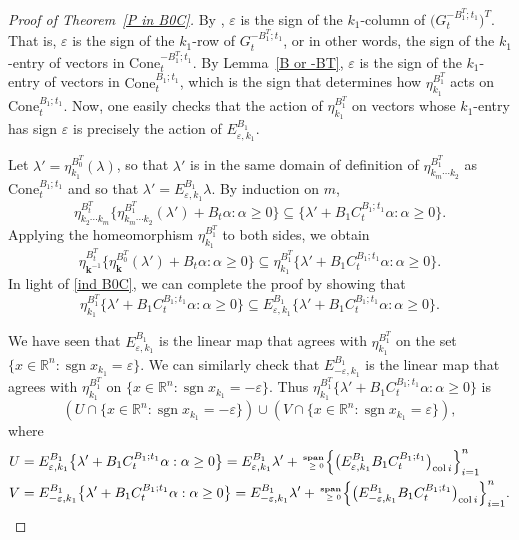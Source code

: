 \documentclass{amsart}
\theoremstyle{definition}
\theoremstyle{remark}
\numberwithin{equation}{section}
\newcommand{\reals}{\mathbb R}
\newcommand{\ep}{\varepsilon}
\newcommand{\col}{\operatorname{col}}
\newcommand{\sgn}{\operatorname{sgn}}
\newcommand{\nnspan}{{\!\!\tiny\begin{array}{r}\mathbf{span}\\\ge0\end{array}\hspace*{-0.57em}}}
\newcommand{\set}[1]{{\lbrace #1 \rbrace}}
\newcommand{\sett}[1]{{\bigl\lbrace #1 \bigr\rbrace}}
\newcommand{\settt}[1]{{\Bigl\lbrace #1 \Bigr\rbrace}}
\renewcommand{\th}{^\text{th}}
\newcommand{\0}{{\mathbf{0}}}
\newcommand{\Cone}{\mathrm{Cone}}
\newcommand{\kk}{{\boldsymbol{k}}}
\renewcommand{\th}{^\text{th}}
\begin{document}
\begin{proof}[Proof of Theorem~\ref{P in B0C}]
By \cite[(1.13)]{NZ}, $\ep$ is the sign of the $k_1$-column of $\bigl(G_t^{-B_1^T;t_1}\bigr)^T$.
That is, $\ep$ is the sign of the $k_1$-row of $G_t^{-B_1^T;t_1}$, or in other words, the sign of the $k_1$-entry of vectors in $\Cone_t^{-B^T_1;t_1}$.
By Lemma~\ref{B or -BT}, $\ep$ is the sign of the $k_1$-entry of vectors in $\Cone_t^{B_1;t_1}$, which is the sign that determines how $\eta_{k_1}^{B_1^T}$ acts on $\Cone_t^{B_1;t_1}$.
Now, one easily checks that the action of $\eta_{k_1}^{B_1^T}$ on vectors whose $k_1$-entry has sign $\ep$ is precisely the action of $E^{B_1}_{\ep,k_1}$.

Let $\lambda'=\eta_{k_1}^{B_0^T}(\lambda)$, so that $\lambda'$ is in the same domain of definition of $\eta_{k_m\cdots k_2}^{B_1^T}$ as $\Cone_t^{B_1;t_1}$ and so that $\lambda'=E^{B_1}_{\ep,k_1}\lambda$.
By induction on $m$, 
\[\eta_{k_2\cdots k_m}^{B_t^T}\set{\eta_{k_m\cdots k_2}^{B_1^T}(\lambda')+B_t\alpha:\alpha\ge0}\subseteq\set{\lambda'+B_1C_t^{B_1;t_1}\alpha:\alpha\ge0}.\]
Applying the homeomorphism $\eta_{k_1}^{B_1^T}$ to both sides, we obtain
\[\eta_{\kk^{-1}}^{B_t^T}\set{\eta_\kk^{B_0^T}(\lambda')+B_t\alpha:\alpha\ge0}\subseteq\eta_{k_1}^{B_1^T}\set{\lambda'+B_1C_t^{B_1;t_1}\alpha:\alpha\ge0}.\]
In light of \eqref{ind B0C}, we can complete the proof by showing that
\[\eta_{k_1}^{B_1^T}\sett{\lambda'+B_1C_t^{B_1;t_1}\alpha:\alpha\ge0}\subseteq E^{B_1}_{\ep,k_1}\sett{\lambda'+B_1C_t^{B_1;t_1}\alpha:\alpha\ge0}.\]

We have seen that $E^{B_1}_{\ep,k_1}$ is the linear map that agrees with $\eta_{k_1}^{B_1^T}$ on the set $\set{x\in\reals^n:\sgn x_{k_1}=\ep}$.
We can similarly check that $E^{B_1}_{-\ep,k_1}$ is the linear map that agrees with $\eta_{k_1}^{B_1^T}$ on $\set{x\in\reals^n:\sgn x_{k_1}=-\ep}$.
Thus $\eta_{k_1}^{B_1^T}\set{\lambda'+B_1C_t^{B_1;t_1}\alpha:\alpha\ge0}$ is
\[(U\cap\set{x\in\reals^n:\sgn x_{k_1}=-\ep})\cup(V\cap\set{x\in\reals^n:\sgn x_{k_1}=\ep}),\]
where %
{\small
\begin{align*}
U&=E^{B_1}_{\ep,k_1}\sett{\lambda'+B_1C_t^{B_1;t_1}\alpha:\alpha\ge0}=E^{B_1}_{\ep,k_1}\lambda'+\nnspan\settt{\bigl(E^{B_1}_{\ep,k_1}B_1C_t^{B_1;t_1}\bigr)_{\col i}}_{i=1}^n\\
V&=E^{B_1}_{-\ep,k_1}\sett{\lambda'+B_1C_t^{B_1;t_1}\alpha:\alpha\ge0}=E^{B_1}_{-\ep,k_1}\lambda'+\nnspan\settt{\bigl(E^{B_1}_{-\ep,k_1}B_1C_t^{B_1;t_1}\bigr)_{\col i}}_{i=1}^n.
\end{align*}
}


\end{proof}
\end{document}
